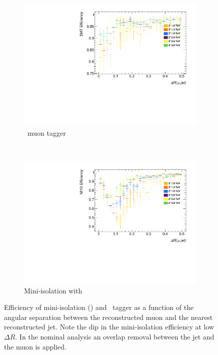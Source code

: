 \begin{figure}[t]
\begin{subfigure}{0.49\linewidth}
  \centering
  \includegraphics[width=\textwidth]{PartBoosted/Plots/he_staco_smt_dr.pdf}
  \caption{\xsm\ muon tagger} \label{fig:BoostedSMTeffVsDRmuj}
\end{subfigure}
~
\begin{subfigure}{0.49\linewidth}
  \centering
  \includegraphics[width=\textwidth]{PartBoosted/Plots/he_muid_mi10_dr.pdf}
  \caption{Mini-isolation with } \label{fig:BoostedMIeffVsDRmuj}
\end{subfigure}

\caption{Efficiency of mini-isolation () and \xsm\ tagger as a function of the angular separation between the reconstructed muon and the nearest reconstructed jet. Note the dip in the mini-isolation efficiency at low $\Delta R$. In the nominal analysis an overlap removal between the jet and the muon is applied.} \label{fig:BoostedEfficiencyVsDRmuj}
\end{figure}

